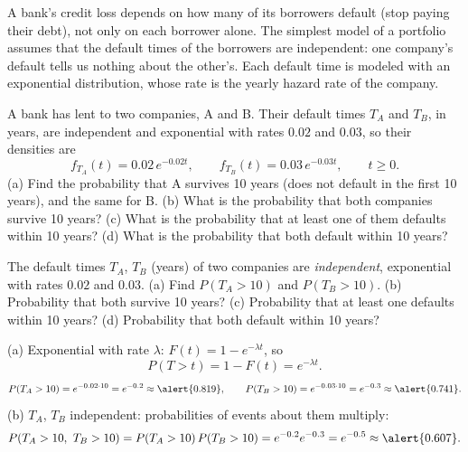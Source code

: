
\begin{problem}
	\begin{context}
		A bank's credit loss depends on how many of its borrowers default
		(stop paying their debt), not only on each borrower alone. The simplest
		model of a portfolio assumes that the default times of the borrowers are
		independent: one company's default tells us nothing about the other's.
		Each default time is modeled with an exponential distribution, whose
		rate is the yearly hazard rate of the company.
	\end{context}
	A bank has lent to two companies, A and B. Their default times $T_A$ and
	$T_B$, in years, are independent and exponential with rates $0.02$ and
	$0.03$, so their densities are
	\[ f_{T_A}(t)=0.02\,e^{-0.02t},\qquad f_{T_B}(t)=0.03\,e^{-0.03t},
		\qquad t\ge0. \]
	(a) Find the probability that A survives 10 years (does not default in
	the first 10 years), and the same for B.
	(b) What is the probability that both companies survive 10 years?
	(c) What is the probability that at least one of them defaults within
	10 years?
	(d) What is the probability that both default within 10 years?
\end{problem}

\begin{slideproblem}
	The default times $T_A$, $T_B$ (years) of two companies are
	\emph{independent}, exponential with rates $0.02$ and $0.03$.
	(a) Find $P(T_A>10)$ and $P(T_B>10)$.
	(b) Probability that both survive 10 years?
	(c) Probability that at least one defaults within 10 years?
	(d) Probability that both default within 10 years?
\end{slideproblem}

\begin{slides}
	\small
	\exstatement
	\pause
	\sol (a) Exponential with rate $\lambda$: $F(t)=1-e^{-\lambda t}$, so
	\[ P(T>t)=1-F(t)=e^{-\lambda t}. \]
	\pause
	\vspace{-2mm}
	\[ P(T_A>10)=e^{-0.02\cdot10}=e^{-0.2}\approx\alert{0.819},\qquad
		P(T_B>10)=e^{-0.03\cdot10}=e^{-0.3}\approx\alert{0.741}. \]
	\pause
	(b) $T_A$, $T_B$ independent: probabilities of events about them
	\alert{multiply}:
	\[ P(T_A>10,\ T_B>10)=P(T_A>10)\,P(T_B>10)=e^{-0.2}e^{-0.3}
		=e^{-0.5}\approx\alert{0.607}. \]
\end{slides}

